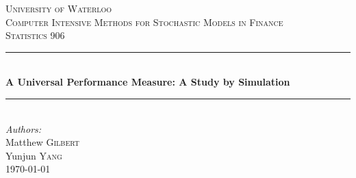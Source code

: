 \documentclass[paper=a4, fontsize=11pt]{scrartcl}
\begin{document}




\begin{titlepage}


\newcommand{\HRule}{\rule{\linewidth}{0.5mm}} %

\center %
 

\textsc{\LARGE University of Waterloo}\\[1.5cm] %
\textsc{\Large Computer Intensive Methods for Stochastic Models in Finance}\\[0.5cm] %
\textsc{\large Statistics 906}\\[0.5cm] %


\HRule \\[0.4cm]
{ \huge \bfseries  A Universal Performance Measure: A Study by Simulation}\\[0.4cm] %
\HRule \\[1.5cm]

\Large \emph{Authors:}\\
Matthew \textsc{Gilbert}\\ %
Yunjun \textsc{Yang}\\[3cm] %


{\large \today}\\[3cm] %

\end{titlepage}

\tableofcontents
\newpage

\end{document}
